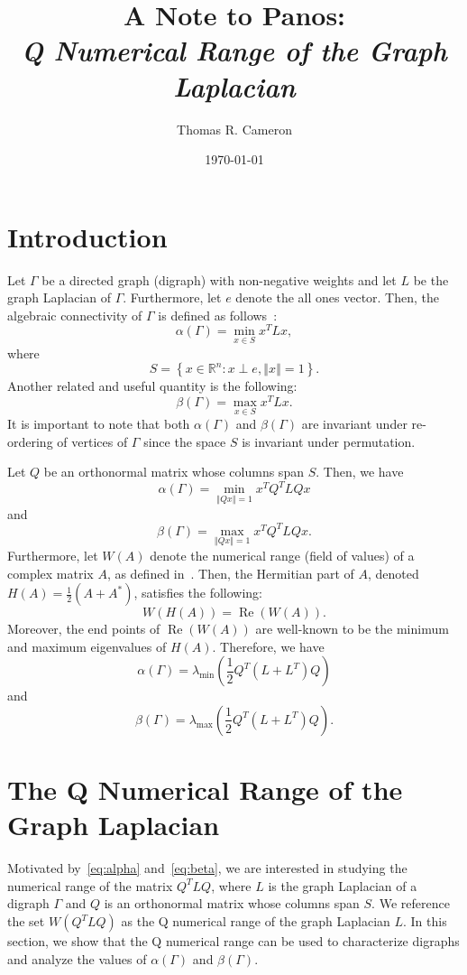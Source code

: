\documentclass{article}
\title{A Note to Panos:\\
\emph{\large{Q Numerical Range of the Graph Laplacian}}}
\author{Thomas R. Cameron}
\date{\today}
\theoremstyle{definition}
\newcommand\norm[1]{\left\Vert#1\right\Vert}
\newcommand\re[1]{\operatorname{Re}\left(#1\right)}
\begin{document}
\maketitle
{}

\section{Introduction}	
Let $\Gamma$ be a directed graph (digraph) with non-negative weights and let $L$ be the graph Laplacian of $\Gamma$. 
Furthermore, let $e$ denote the all ones vector. 
Then, the algebraic connectivity of $\Gamma$ is defined as follows~\cite{Wu2005-1}:
\[
\alpha(\Gamma)=\min_{x\in S}x^{T}Lx,
\]
where
\[
S=\left\{x\in\mathbb{R}^{n}\colon x\perp e,\norm{x}=1\right\}.
\]
Another related and useful quantity is the following:
\[
\beta(\Gamma)=\max_{x\in S}x^{T}Lx.
\]
It is important to note that both $\alpha(\Gamma)$ and $\beta(\Gamma)$ are invariant under re-ordering of vertices of $\Gamma$ since the space $S$ is invariant under permutation.

Let $Q$ be an orthonormal matrix whose columns span $S$.
Then, we have
\[
\alpha(\Gamma)=\min_{\norm{Qx}=1}x^{T}Q^{T}LQx
\]
and
\[
\beta(\Gamma)=\max_{\norm{Qx}=1}x^{T}Q^{T}LQx.
\]
Furthermore, let $W(A)$ denote the numerical range (field of values) of a complex matrix $A$, as defined in~\cite{Horn1991}.
Then, the Hermitian part of $A$, denoted $H(A)=\frac{1}{2}(A+A^{*})$, satisfies the following:
\[
W(H(A))=\re{W(A)}.
\]
Moreover, the end points of $\re{W(A)}$ are well-known to be the minimum and maximum eigenvalues of $H(A)$. 
Therefore, we have
\begin{equation}\label{eq:alpha}
\alpha(\Gamma)=\lambda_{\text{min}}\left(\frac{1}{2}Q^{T}(L+L^{T})Q\right)
\end{equation}
and
\begin{equation}\label{eq:beta}
\beta(\Gamma)=\lambda_{\text{max}}\left(\frac{1}{2}Q^{T}(L+L^{T})Q\right).
\end{equation}

\section{The Q Numerical Range of the Graph Laplacian}
Motivated by~\eqref{eq:alpha} and~\eqref{eq:beta}, we are interested in studying the numerical range of the matrix $Q^{T}LQ$, where $L$ is the graph Laplacian of a digraph $\Gamma$ and $Q$ is an orthonormal matrix whose columns span $S$.
We reference the set $W(Q^{T}LQ)$ as the Q numerical range of the graph Laplacian $L$.
In this section, we show that the Q numerical range can be used to characterize digraphs and analyze the values of $\alpha(\Gamma)$ and $\beta(\Gamma)$. 
\end{document}
